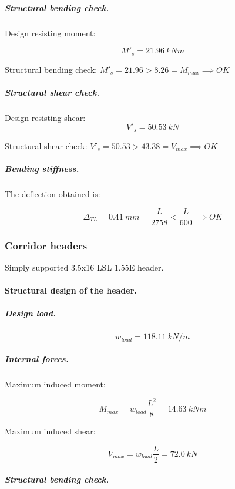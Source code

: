 \subparagraph{Structural bending check.}

\noindent Design resisting moment:

\begin{equation}
  M'_s= 21.96\ kN m
\end{equation}

\noindent Structural bending check: $M'_s = 21.96 > 8.26 = M_{max} \implies OK$

\subparagraph{Structural shear check.}

\noindent Design resisting shear:
\begin{equation}
  V'_s= 50.53\ kN
\end{equation}

\noindent Structural shear check: $V'_s = 50.53 > 43.38 = V_{max} \implies OK$

\subparagraph{Bending stiffness.}
The deflection obtained is:

\begin{equation}
  \Delta_{TL}= 0.41\ mm= \frac{L}{2758} < \frac{L}{600} \implies OK
\end{equation}

\subsubsection{Corridor headers}
Simply supported 3.5x16 LSL 1.55E header.

\paragraph{Structural design of the header.}

\subparagraph{Design load.}

\begin{equation}
  w_{load}= 118.11\ kN/m
\end{equation}

\subparagraph{Internal forces.}

\noindent Maximum induced moment:

\begin{equation}
  M_{max}= w_{load} \frac{L^2}{8}= 14.63\ kN m
\end{equation}

\noindent Maximum induced shear:

\begin{equation}
  V_{max}= w_{load} \frac{L}{2}= 72.0\ kN
\end{equation}

\subparagraph{Structural bending check.}

